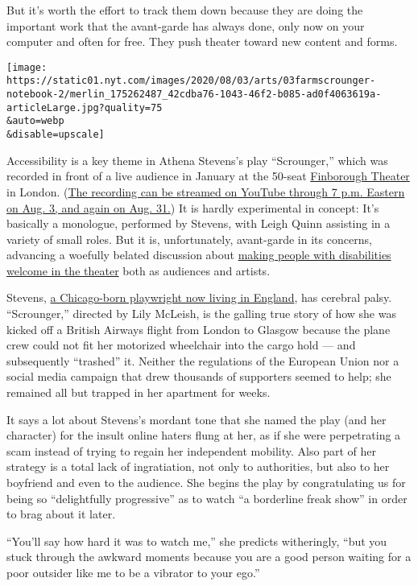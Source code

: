 But it's worth the effort to track them down because they are doing the
important work that the avant-garde has always done, only now on your
computer and often for free. They push theater toward new content and
forms.

\texttt{[image: https://static01.nyt.com/images/2020/08/03/arts/03farmscrounger-notebook-2/merlin\_175262487\_42cdba76-1043-46f2-b085-ad0f4063619a-articleLarge.jpg?quality=75\\\&auto=webp\\\&disable=upscale]}

Accessibility is a key theme in Athena Stevens's play ``Scrounger,''
which was recorded in front of a live audience in January at the 50-seat
\href{https://finboroughtheatre.co.uk}{Finborough Theater} in London.
(\href{https://www.youtube.com/watch?v=1o8jvP5djME}{The recording can be
streamed on YouTube through 7 p.m. Eastern on Aug. 3, and again on Aug.
31.}) It is hardly experimental in concept: It's basically a monologue,
performed by Stevens, with Leigh Quinn assisting in a variety of small
roles. But it is, unfortunately, avant-garde in its concerns, advancing
a woefully belated discussion about
\href{https://www.nytimes.com/2020/01/13/theater/under-the-radar-festival-neurodiversity.html}{making
people with disabilities welcome in the theater} both as audiences and
artists.

Stevens, \href{https://www.athenastevens.com/}{a Chicago-born playwright
now living in England}, has cerebral palsy. ``Scrounger,'' directed by
Lily McLeish, is the galling true story of how she was kicked off a
British Airways flight from London to Glasgow because the plane crew
could not fit her motorized wheelchair into the cargo hold --- and
subsequently ``trashed'' it. Neither the regulations of the European
Union nor a social media campaign that drew thousands of supporters
seemed to help; she remained all but trapped in her apartment for weeks.

It says a lot about Stevens's mordant tone that she named the play (and
her character) for the insult online haters flung at her, as if she were
perpetrating a scam instead of trying to regain her independent
mobility. Also part of her strategy is a total lack of ingratiation, not
only to authorities, but also to her boyfriend and even to the audience.
She begins the play by congratulating us for being so ``delightfully
progressive'' as to watch ``a borderline freak show'' in order to brag
about it later.

``You'll say how hard it was to watch me,'' she predicts witheringly,
``but you stuck through the awkward moments because you are a good
person waiting for a poor outsider like me to be a vibrator to your
ego.''

